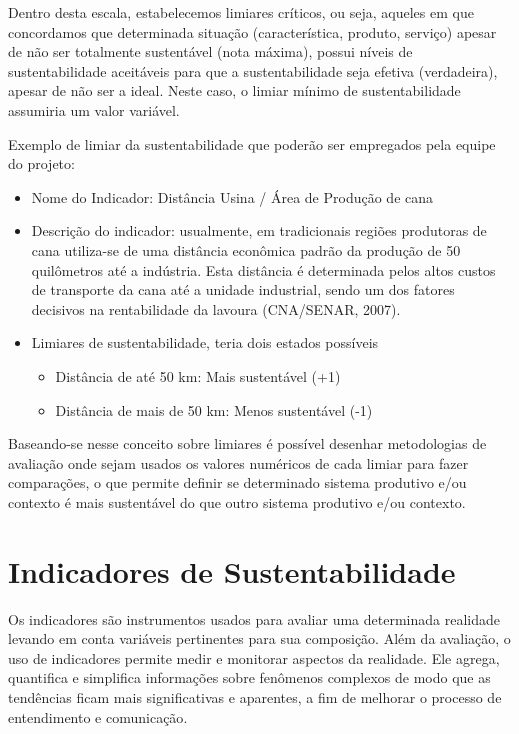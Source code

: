 Dentro desta escala, estabelecemos limiares críticos, ou seja, aqueles
em que concordamos que determinada situação (característica, produto,
serviço) apesar de não ser totalmente sustentável (nota máxima), possui
níveis de sustentabilidade aceitáveis para que a sustentabilidade
seja efetiva (verdadeira), apesar de não ser a ideal. Neste caso,
o limiar mínimo de sustentabilidade assumiria um valor variável.

Exemplo de limiar da sustentabilidade que poderão ser empregados pela
equipe do projeto:
\begin{itemize}
\item Nome do Indicador: Distância Usina / Área de Produção de cana
\item Descrição do indicador: usualmente, em tradicionais regiões produtoras
de cana utiliza-se de uma distância econômica padrão da produção de
50 quilômetros até a indústria. Esta distância é determinada pelos
altos custos de transporte da cana até a unidade industrial, sendo
um dos fatores decisivos na rentabilidade da lavoura (CNA/SENAR, 2007).
\item Limiares de sustentabilidade, teria dois estados possíveis 

\begin{itemize}
\item Distância de até 50 km: Mais sustentável (+1)
\item Distância de mais de 50 km: Menos sustentável (-1)
\end{itemize}
\end{itemize}
Baseando-se nesse conceito sobre limiares é possível desenhar metodologias
de avaliação onde sejam usados os valores numéricos de cada limiar
para fazer comparações, o que permite definir se determinado sistema
produtivo e/ou contexto é mais sustentável do que outro sistema produtivo
e/ou contexto.

\section{Indicadores de Sustentabilidade}

Os indicadores são instrumentos usados para avaliar uma determinada
realidade levando em conta variáveis pertinentes para sua composição.
Além da avaliação, o uso de indicadores permite medir e monitorar
aspectos da realidade. Ele agrega, quantifica e simplifica informações
sobre fenômenos complexos de modo que as tendências ficam mais significativas
e aparentes, a fim de melhorar o processo de entendimento e comunicação\citep{bossel1999indicators,van2005indicadores}.


